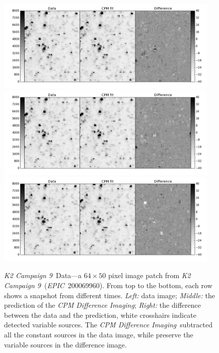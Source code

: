 \documentclass[12pt, preprint]{aastex}
\newcommand{\project}[1]{\textsl{#1}}
\newcommand{\cpmdiff}{\project{CPM Difference Imaging}}
\newcommand{\KTCN}{\project{K2 Campaign 9}}
\newcommand{\epic}{\project{EPIC}}
\begin{document}
\begin{figure}[p]
\begin{center}
\includegraphics[width=0.95\textwidth]{f5a}
\includegraphics[width=0.95\textwidth]{f5b}
\includegraphics[width=0.95\textwidth]{f5c}
\end{center}
\caption{
  \label{k2c9}
  \KTCN\ Data---a $64\times 50$ pixel image patch from \KTCN\ (\epic\ 200069960). 
  From top to the bottom,  each row shows a snapshot from different times.
  \emph{Left:} data image;
  \emph{Middle:} the prediction of the \cpmdiff;
  \emph{Right:} the difference between the data and the prediction, white crosshairs indicate detected variable sources.
  The \cpmdiff\ subtracted all the constant sources in the data image, while preserve the variable sources in the difference image.
}
\end{figure}
\end{document}
